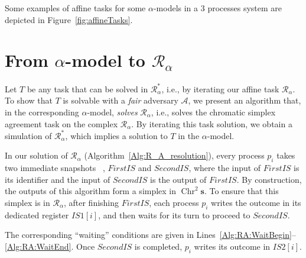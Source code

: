 \documentclass[a4paper]{article}
\def\A{\ensuremath{\mathcal{A}}}
\def\R{\ensuremath{\mathcal{R}}}
\def\fair{\textit{fair}}
\newcommand{\remove}[1]{}
\def\s {\mathbf{s}}
\def\Chr{\operatorname{Chr}}
\begin{document}
Some examples of affine tasks for some $\alpha$-models 
in a 3 processes system are depicted in Figure~\ref{fig:affineTasks}.


\section{From $\alpha$-model to $\R_{\alpha}$} %
\label{sec:R}

Let $T$ be any task that can be solved in $\R_{\alpha}^*$, i.e.,
by iterating our affine task $\R_{\alpha}$.
To show that $T$ is solvable with a {\fair} adversary $\A$, we present
an algorithm that,  in the corresponding
$\alpha$-model, \emph{solves} $\R_{\alpha}$, i.e.,        
solves the chromatic simplex agreement task
on the complex $\R_{\alpha}$.
%
By iterating this task solution, we obtain a simulation of
$\R_{\alpha}^*$, which implies a solution to $T$ in the $\alpha$-model.


In our solution of $\R_{\alpha}$ (Algorithm~\ref{Alg:R_A_resolution}),
every process $p_i$ takes two immediate snapshots ~\cite{BG97},
$\mathit{FirstIS}$ and $\mathit{SecondIS}$, where the input of $\mathit{FirstIS}$ is its identifier and the input of $\mathit{SecondIS}$ is the output of $\mathit{FirstIS}$.
%
By construction, the outputs of this algorithm form a simplex in
$\Chr^2\s$. To ensure that this simplex is in $\R_{\alpha}$,
after finishing $\mathit{FirstIS}$, each process $p_i$ writes the outcome in its dedicated register
$\mathit{IS1}[i]$, and then waits for its turn to proceed to 
$\mathit{SecondIS}$.
%
\remove{
processes execute a first immediate snapshot, 
share their immediate snapshot output and then wait their 
``turn'' before executing the second immediate snapshot.
The structure of the algorithm is quite similar to the one
proposed in~\cite{SHG16}. Indeed, as for the $t$-resilient
case, the $\alpha$-model has a structure allowing to directly
solve $\R_\alpha$ without using simulation techniques as it 
would be the case for a generic adversarial model. The difference
with the solution proposed in~\cite{SHG16} just lies in the
more elaborated conditions which must be satisfied before a 
process is allowed to continue with the second immediate
snapshot. 
}
The corresponding ``waiting'' conditions are given in 
Lines~\ref{Alg:RA:WaitBegin}--\ref{Alg:RA:WaitEnd}.
%
Once $\mathit{SecondIS}$ is completed, $p_i$
writes its outcome in $\mathit{IS2}[i]$. 
\end{document}
